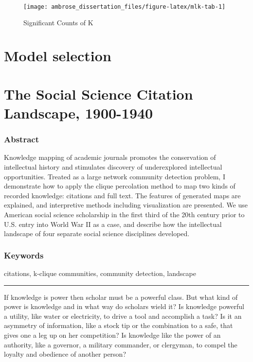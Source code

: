 \documentclass[]{book}
\theoremstyle{definition}
\theoremstyle{definition}
\theoremstyle{definition}
\theoremstyle{remark}
\begin{document}
\begin{figure}

{\centering \texttt{[image: ambrose\_dissertation\_files/figure-latex/mlk-tab-1]} 

}

\caption{Significant Counts of K}\label{fig:mlk-tab}
\end{figure}

\hypertarget{model-selection}{%
\section{Model selection}\label{model-selection}}

\hypertarget{cit}{%
\section{The Social Science Citation Landscape, 1900-1940}\label{cit}}

\hypertarget{abstract-4}{%
\subsubsection*{Abstract}\label{abstract-4}}


Knowledge mapping of academic journals promotes the
conservation of intellectual history and stimulates discovery of
underexplored intellectual opportunities. Treated as a large network
community detection problem, I demonstrate how to apply the clique
percolation method to map two kinds of recorded knowledge: citations and
full text. The features of generated maps are explained, and
interpretive methods including visualization are presented. We use
American social science scholarship in the first third of the 20th
century prior to U.S. entry into World War II as a case, and describe
how the intellectual landscape of four separate social science
disciplines developed.

\hypertarget{keywords-4}{%
\subsubsection*{Keywords}\label{keywords-4}}


citations, k-clique communities, community detection,
landscape

\begin{center}\rule{0.5\linewidth}{\linethickness}\end{center}

If knowledge is power then scholar must be a powerful class. But what
kind of power is knowledge and in what way do scholars wield it? Is
knowledge powerful a utility, like water or electricity, to drive a tool
and accomplish a task? Is it an asymmetry of information, like a stock
tip or the combination to a safe, that gives one a leg up on her
competition? Is knowledge like the power of an authority, like a
governor, a military commander, or clergyman, to compel the loyalty and
obedience of another person?
\end{document}
